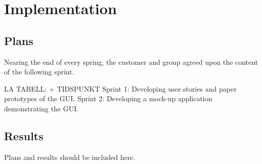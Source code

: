 \chapter{Implementation}
\section{Plans}

Nearing the end of every spring, the customer and group agreed upon the content of the following sprint. 

LA TABELL: + TIDSPUNKT
Sprint 1: Developing user stories and paper prototypes of the GUI.
Sprint 2: Developing a mock-up application demonstrating the GUI.

\section{Results}
 Plans and results should be included here. 
